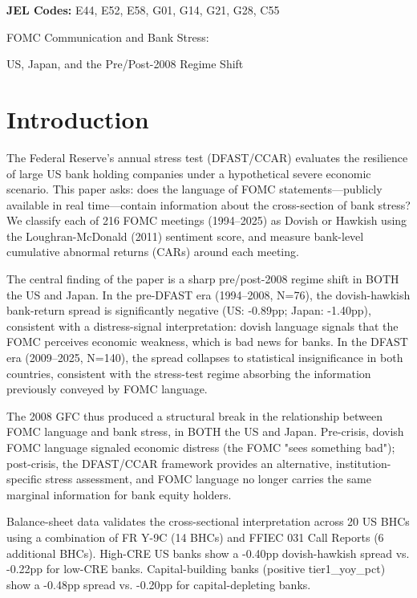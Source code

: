 \documentclass[12pt,a4paper]{article}
\begin{document}
\noindent\textbf{JEL Codes:} E44, E52, E58, G01, G14, G21, G28, C55

\newpage

FOMC Communication and Bank Stress:

US, Japan, and the Pre/Post-2008 Regime Shift

\section{Introduction}

The Federal Reserve's annual stress test (DFAST/CCAR) evaluates the resilience of large US bank holding companies under a hypothetical severe economic scenario. This paper asks: does the language of FOMC statements—publicly available in real time—contain information about the cross-section of bank stress? We classify each of 216 FOMC meetings (1994–2025) as Dovish or Hawkish using the Loughran-McDonald (2011) sentiment score, and measure bank-level cumulative abnormal returns (CARs) around each meeting.

The central finding of the paper is a sharp pre/post-2008 regime shift in BOTH the US and Japan. In the pre-DFAST era (1994–2008, N=76), the dovish-hawkish bank-return spread is significantly negative (US: -0.89pp; Japan: -1.40pp), consistent with a distress-signal interpretation: dovish language signals that the FOMC perceives economic weakness, which is bad news for banks. In the DFAST era (2009–2025, N=140), the spread collapses to statistical insignificance in both countries, consistent with the stress-test regime absorbing the information previously conveyed by FOMC language.

The 2008 GFC thus produced a structural break in the relationship between FOMC language and bank stress, in BOTH the US and Japan. Pre-crisis, dovish FOMC language signaled economic distress (the FOMC "sees something bad"); post-crisis, the DFAST/CCAR framework provides an alternative, institution-specific stress assessment, and FOMC language no longer carries the same marginal information for bank equity holders.

Balance-sheet data validates the cross-sectional interpretation across 20 US BHCs using a combination of FR Y-9C (14 BHCs) and FFIEC 031 Call Reports (6 additional BHCs). High-CRE US banks show a -0.40pp dovish-hawkish spread vs. -0.22pp for low-CRE banks. Capital-building banks (positive tier1\_yoy\_pct) show a -0.48pp spread vs. -0.20pp for capital-depleting banks.
\end{document}

